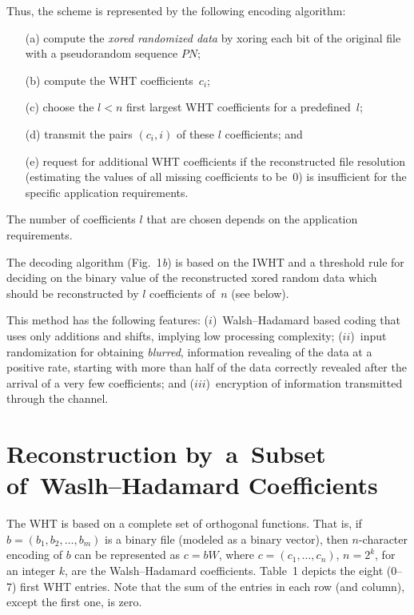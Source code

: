 \begin{multicols}{2}
Thus, the scheme is represented by the following encoding algorithm:
\begin{itemize}
\item[(a)] compute the {\it xored randomized data} by xoring each bit of the original file with a pseudorandom sequence $PN$;
\item[(b)] compute the WHT coefficients~$c_i$;
\item[(c)]  choose the $l<n$ first largest WHT coefficients for a predefined~$l$;
\item[(d)]  transmit the pairs $(c_i,i)$ of these $l$ coefficients; and
\item[(e)] request for additional WHT coefficients if the
reconstructed file resolution (estimating the values of all missing coefficients 
to be~0) is insufficient for the specific application requirements.
\end{itemize}

The number of coefficients $l$ that are chosen  depends on the application requirements.

The decoding algorithm (Fig.~1\textit{b})
is based on the IWHT and a threshold rule for 
deciding on the binary value of the reconstructed xored random data which should 
be reconstructed  by $l$ coefficients of~$n$ (see below).

This method has the following features:  ($i$)~Walsh--Hadamard based coding that uses 
only additions and shifts, implying low processing complexity; 
($ii$)~input randomization for obtaining {\it blurred}, information revealing of the 
data at a positive rate, starting
with more than half of the data correctly revealed after the arrival of a very few coefficients; and
($iii$)~encryption of information transmitted through the channel.

\section{Reconstruction by~a~Subset of~Waslh--Hadamard Coefficients}

\noindent
The WHT is based on a complete set of orthogonal functions.
 That is, if $b=(b_1,b_2,\ldots,b_m)$ is a
binary file (modeled as a binary vector), then $n$-character encoding of $b$ 
can be represented as $c=bW$, where $c=(c_1,\ldots,c_n)$, $n=2^k$, for an 
integer $k$, are the Walsh--Hadamard coefficients. Table~1 depicts the eight 
(0--7) first WHT entries. Note that the sum of the entries in each row (and column), 
except the first one, is zero.



\end{multicols}
